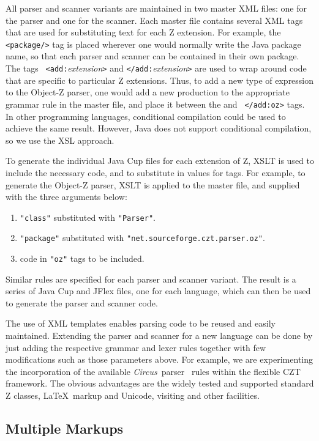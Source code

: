 \documentclass{llncs}
\newcommand{\Circus}{{\sf\slshape Circus}}
\begin{document}
All parser and scanner variants are maintained in two master XML
files: one for the parser and one for the scanner. Each master file
contains several XML tags that are used for substituting text for each
Z extension. For example, the {\tt <package/>} tag is placed wherever
one would normally write the Java package name, so that each parser
and scanner can be contained in their own package. The tags {\tt
<add:}{\em extension}{\tt >} and {\tt </add:}{\em extension}{\tt >}
are used to wrap around code that are specific to particular Z
extensions. Thus, to add a new type of expression to the Object-Z parser,
one would add a new production to the appropriate grammar rule in the
master file, and place it between the {\tt <add:oz>} and {\tt
</add:oz>} tags. In other programming languages, conditional compilation
could be used to achieve the same result. However, Java does not
support conditional compilation, so we use the XSL approach.

To generate the individual Java Cup files for each extension of Z,
XSLT is used to include the necessary code, and to substitute in
values for tags. For example, to generate the Object-Z parser, XSLT is
applied to the master file, and supplied with the three arguments
below:
\begin{enumerate}
  \item {\tt "class"} substituted with {\tt "Parser"}.
  \item {\tt "package"} substituted with {\tt "net.sourceforge.czt.parser.oz"}.
  \item code in {\tt "oz"} tags to be included.
\end{enumerate}

Similar rules are specified for each parser and scanner variant. The
result is a series of Java Cup and JFlex files, one for each language,
which can then be used to generate the parser and scanner code.

The use of XML templates enables parsing code to be reused and easily
maintained.  Extending the parser and scanner for a new language can
be done by just adding the respective grammar and lexer rules together
with few modifications such as those parameters above.  For example,
we are experimenting the incorporation of the available \Circus\
parser~\cite{circus.other:parser} rules within the flexible CZT
framework. The obvious advantages are the widely tested and supported
standard Z classes, \LaTeX\ markup and Unicode, visiting and other
facilities.

\subsection{Multiple Markups}\label{multiple-markups}
\end{document}
